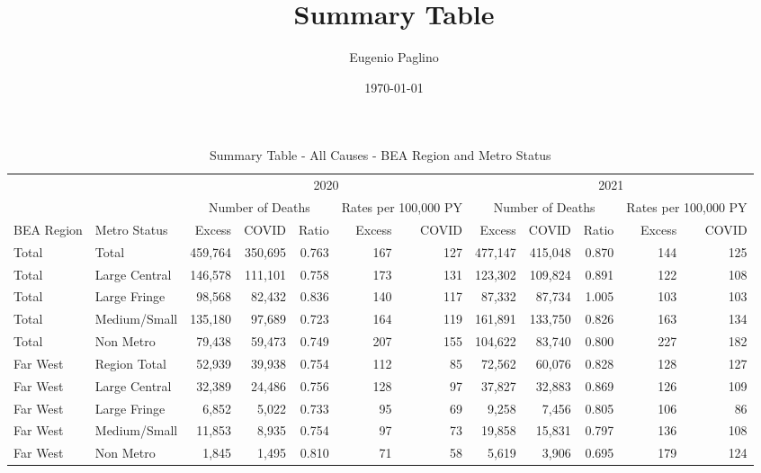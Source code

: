 \documentclass[
]{article}
\title{Summary Table}
\author{Eugenio Paglino}
\date{\today}
\begin{document}
\maketitle

\begin{table}

\caption{\label{tab:unnamed-chunk-8}Summary Table - All Causes - BEA Region and Metro Status}
\centering
\fontsize{7.5}{9.5}\selectfont
\begin{tabular}[t]{llrrrrrrrrrr}
\toprule
\multicolumn{2}{c}{ } & \multicolumn{5}{c}{2020} & \multicolumn{5}{c}{2021} \\
\cmidrule(l{3pt}r{3pt}){3-7} \cmidrule(l{3pt}r{3pt}){8-12}
\multicolumn{2}{c}{ } & \multicolumn{3}{c}{Number of Deaths} & \multicolumn{2}{c}{Rates per 100,000 PY} & \multicolumn{3}{c}{Number of Deaths} & \multicolumn{2}{c}{Rates per 100,000 PY} \\
\cmidrule(l{3pt}r{3pt}){3-5} \cmidrule(l{3pt}r{3pt}){6-7} \cmidrule(l{3pt}r{3pt}){8-10} \cmidrule(l{3pt}r{3pt}){11-12}
BEA Region & Metro Status & Excess & COVID & Ratio & Excess & COVID & Excess & COVID & Ratio & Excess & COVID\\
\midrule
Total & Total & 459,764 & 350,695 & 0.763 & 167 & 127 & 477,147 & 415,048 & 0.870 & 144 & 125\\
\addlinespace[2pt]
Total & Large Central & 146,578 & 111,101 & 0.758 & 173 & 131 & 123,302 & 109,824 & 0.891 & 122 & 108\\
Total & Large Fringe & 98,568 & 82,432 & 0.836 & 140 & 117 & 87,332 & 87,734 & 1.005 & 103 & 103\\
Total & Medium/Small & 135,180 & 97,689 & 0.723 & 164 & 119 & 161,891 & 133,750 & 0.826 & 163 & 134\\
Total & Non Metro & 79,438 & 59,473 & 0.749 & 207 & 155 & 104,622 & 83,740 & 0.800 & 227 & 182\\
\addlinespace[5pt]
Far West & Region Total & 52,939 & 39,938 & 0.754 & 112 & 85 & 72,562 & 60,076 & 0.828 & 128 & 127\\
\addlinespace[2pt]
Far West & Large Central & 32,389 & 24,486 & 0.756 & 128 & 97 & 37,827 & 32,883 & 0.869 & 126 & 109\\
Far West & Large Fringe & 6,852 & 5,022 & 0.733 & 95 & 69 & 9,258 & 7,456 & 0.805 & 106 & 86\\
Far West & Medium/Small & 11,853 & 8,935 & 0.754 & 97 & 73 & 19,858 & 15,831 & 0.797 & 136 & 108\\
Far West & Non Metro & 1,845 & 1,495 & 0.810 & 71 & 58 & 5,619 & 3,906 & 0.695 & 179 & 124\\

\end{tabular}
\end{table}
\end{document}
